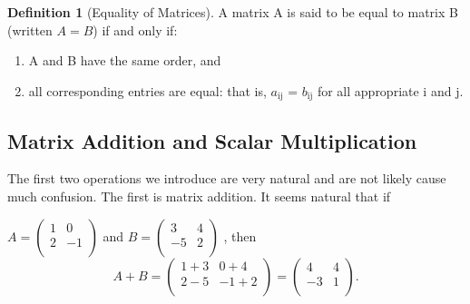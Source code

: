 \documentclass[10pt,]{book}
\theoremstyle{plain}
\theoremstyle{definition}
\newtheorem{definition}[theorem]{Definition}
\theoremstyle{definition}
\theoremstyle{definition}
\theoremstyle{definition}
\begin{document}
\begin{definition}[Equality of Matrices]\label{def-matrix-equality}
A matrix A is said to be equal to matrix B (written \(A = B\)) if and only if:%
\par
\leavevmode%
\begin{enumerate}[label=\arabic*]
\item\hypertarget{li-1}{} A and B have the same order, and%
\item\hypertarget{li-2}{} all corresponding entries are equal: that is, \(a_{\text{ij}}\) = \(b_{\text{ij}}\) for all appropriate i and j.%
\end{enumerate}
%
\end{definition}
\typeout{************************************************}
\typeout{************************************************}
\subsection[Matrix Addition and Scalar Multiplication]{Matrix Addition and Scalar Multiplication}\label{ss-matrix-addition-scalarmult}
The first two operations we introduce are very natural and are not likely cause much confusion. The first is matrix addition. It seems natural that if

\(A =\left(
\begin{array}{cc}
 1 & 0 \\
 2 & -1 \\
\end{array}
\right)\)
and 
\(B =\left(
\begin{array}{cc}
 3 & 4 \\
 -5 & 2 \\
\end{array}
\right)\) , then \begin{equation*}A + B =\left(
\begin{array}{cc}
 1+3 & 0+4 \\
 2-5 & -1+2 \\
\end{array}
\right)=\left(
\begin{array}{cc}
 4 & 4 \\
 -3 & 1 \\
\end{array}
\right). 
\end{equation*}
%
\par
\end{document}
